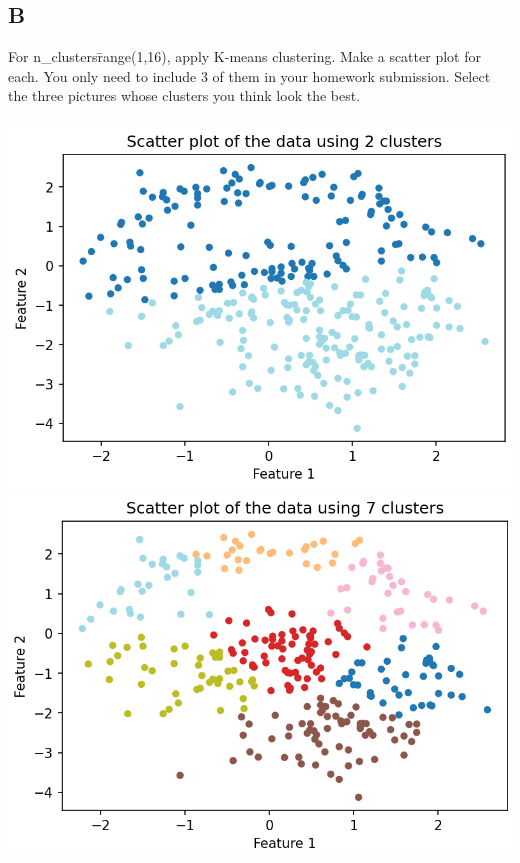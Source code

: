\documentclass[12pt]{article}
\begin{document}
\subsection{B}
For n\_clusters\=range(1,16), apply K-means clustering. Make a scatter plot for each. You only need to include 3 of them in your homework submission. Select the three pictures whose clusters you think look the best.\\\\
\includegraphics[width=1\textwidth]{p2.b.1.png}\\
\includegraphics[width=1\textwidth]{p2.b.2.png}\\
\end{document}
